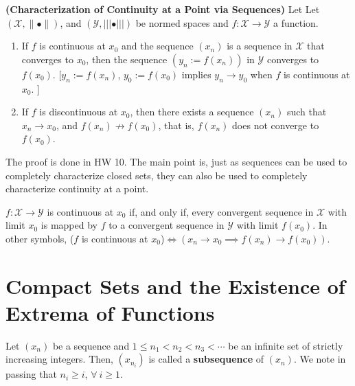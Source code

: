 \begin{thm} \textbf{(Characterization of Continuity at a Point via Sequences)} Let  Let $\left(\mathcal{X},\| \bullet \|\right)$, and $\left(\mathcal{Y},||| \bullet |||\right)$ be normed spaces and $f:\mathcal{X} \to \mathcal{Y}$ a function.
    \begin{enumerate}
       \renewcommand{\labelenumi}{(\alph{enumi})}
        \setlength{\itemsep}{.1cm}
        \item If $f$ is continuous at $x_0$ and the sequence $\left(x_n\right)$ is a sequence in $\mathcal{X}$ that converges to $x_0$, then the sequence $(y_n:=f(x_n))$ in $\mathcal{Y}$ converges to $f(x_0)$. [$y_n:=f(x_n)$, $y_0:=f(x_0)$ implies $y_n \to y_0$ when $f$ is continuous at $x_0$. ]
        \item If $f$ is discontinuous at $x_0$, then there exists a sequence $\left(x_n\right)$ such that $ x_n \to x_0$, and $f\left(x_n\right) \not \to  f\left(x_0\right)$, that is, $f\left(x_n\right)$ does not converge to $f\left(x_0\right)$.
    \end{enumerate}
    
\end{thm} 

The proof is done in HW 10. The main point is, just as sequences can be used to completely characterize closed sets, they can also be used to completely characterize continuity at a point. 

\begin{cor} $f:\mathcal{X} \to \mathcal{Y}$ is continuous at $x_0$ if, and only if, every convergent sequence in $\mathcal{X}$ with limit $x_0$ is mapped by $f$ to a convergent sequence in $\mathcal{Y}$ with limit $f(x_0)$. In other symbols,  ($f$ is continuous at $x_0$)$\iff (x_n \to x_0 \implies f(x_n) \to f(x_0)).$ 

\end{cor}

\section{Compact Sets and the Existence of Extrema of Functions}

\begin{definition}  Let $(x_n)$ be a sequence and $1\le n_1<n_2<n_3<\dotsb $ be an infinite set of strictly increasing integers. Then, $(x_{n_i})$ is called a \textbf{ subsequence} of $(x_n)$. We note in passing that $n_i \ge i$, $\forall ~i\ge1$.
\end{definition}

